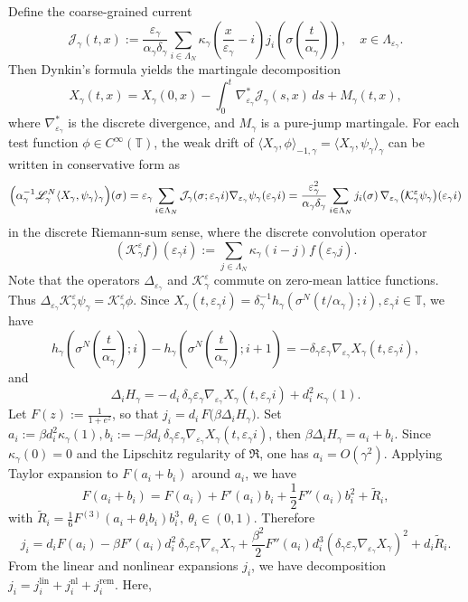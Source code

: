 \documentclass{article}
\begin{document}
Define the coarse-grained current
\[
\mathcal J_\gamma(t,x)
:=
\frac{\varepsilon_\gamma}{\alpha_\gamma\delta_\gamma}
\sum_{i\in\Lambda_N} \kappa_\gamma\!\left(\frac{x}{\varepsilon_\gamma}-i\right)
j_i\!\left(\sigma\!\left(\frac{t}{\alpha_\gamma}\right)\right), \quad x \in \Lambda_{\varepsilon_{\gamma}}.
\]
Then Dynkin's formula yields the martingale decomposition
\[
X_\gamma(t,x) = X_\gamma(0,x) - \int_0^t \nabla^*_{\varepsilon_\gamma} \mathcal J_\gamma(s,x)\,ds + M_\gamma(t,x),
\]
where $\nabla_{\varepsilon_\gamma}^*$ is the discrete divergence, and $M_\gamma$ is a pure-jump martingale.
For each test function $\phi \in C^{\infty}(\mathbb T)$, the weak drift of \(\langle X_\gamma, \phi\rangle_{-1,\gamma}=\langle X_\gamma,\psi_\gamma\rangle_\gamma\) can be written in conservative form as
\[
\Bigl(\alpha_\gamma^{-1}\mathscr L_\gamma^{N}\langle X_\gamma,\psi_\gamma\rangle_\gamma\Bigr)(\sigma) =  \varepsilon_\gamma\sum_{i \in \Lambda_N }\mathcal J_\gamma(\sigma;\varepsilon_{\gamma} i) \nabla_{\varepsilon_\gamma}\psi_\gamma(\varepsilon_{\gamma} i)
=
\frac{\varepsilon_\gamma^2}{\alpha_\gamma\delta_\gamma}
\sum_{i\in\Lambda_N}j_i(\sigma)\,
\nabla_{\varepsilon_\gamma}\bigl(\mathcal K_\gamma^\varepsilon\psi_\gamma\bigr)(\varepsilon_\gamma i) 
\]
in the discrete Riemann-sum sense, where the discrete convolution operator
\[
(\mathcal K_\gamma^\varepsilon f)(\varepsilon_\gamma i):= \sum_{j \in\Lambda_N}\kappa_\gamma(i-j)f(\varepsilon_\gamma j).
\]
Note that the operators \(\Delta_{\varepsilon_\gamma}\) and \(\mathcal K_\gamma^\varepsilon\)  commute on zero-mean lattice functions. Thus
\( \Delta_{\varepsilon_\gamma}\mathcal K_\gamma^\varepsilon\psi_\gamma = \mathcal K_\gamma^\varepsilon\phi\).
Since \( X_\gamma(t,\varepsilon_\gamma i)
=
\delta_\gamma^{-1}
h_\gamma\!\left(\sigma^N(t/\alpha_\gamma);i\right), \varepsilon_\gamma i\in \mathbb T\), we have
\[
h_\gamma\!\left(\sigma^N\left(\frac{t}{\alpha_\gamma}\right);i\right)
-
h_\gamma\!\left(\sigma^N\left(\frac{t}{\alpha_\gamma}\right);i+1\right)
=
-\delta_\gamma\varepsilon_\gamma
\nabla_{\varepsilon_\gamma}X_\gamma(t, \varepsilon_{\gamma} i),
\]
and
\[
\Delta_i H_\gamma = -\,d_i\,\delta_\gamma\varepsilon_\gamma
\nabla_{\varepsilon_\gamma}X_\gamma(t,\varepsilon_{\gamma} i)
+d_i^2\,\kappa_\gamma(1).
\]
Let \(F(z):=\frac{1}{1+e^z}\), so that
\(
j_i=d_i\,F\!\bigl(\beta\Delta_i H_\gamma\bigr).
\)
Set
\(a_i:=\beta d_i^2\kappa_\gamma(1), b_i:=-\beta d_i\,\delta_\gamma\varepsilon_\gamma
\nabla_{\varepsilon_\gamma}X_\gamma(t,\varepsilon_{\gamma} i)\), then
\(
\beta\Delta_i H_\gamma=a_i+b_i.
\)
Since $ \kappa_{\gamma}(0) = 0$ and the Lipschitz regularity of $\mathfrak R$, one has \(a_i=O(\gamma^2)\).
Applying Taylor expansion to \(F(a_i+b_i)\) around \(a_i\), we have
\[
F(a_i+b_i) = F(a_i)+F'(a_i)b_i+\frac12F''(a_i)b_i^2+ \widetilde R_i,
\]
with
\(
\widetilde R_i = \frac16 F^{(3)}(a_i+\theta_i b_i)b_i^3, \ \theta_i\in(0,1).
\)
Therefore
\[
j_i = d_iF(a_i)
-\beta F'(a_i)d_i^2\,\delta_\gamma\varepsilon_\gamma
\nabla_{\varepsilon_\gamma}X_\gamma
+\frac{\beta^2}{2}F''(a_i)d_i^3
(\delta_\gamma\varepsilon_\gamma\nabla_{\varepsilon_\gamma}X_\gamma)^2
+ d_i \widetilde R_i.
\]
From the linear and nonlinear expansions $j_i$, we have decomposition
\(
j_i =j_i^{\mathrm{lin}}+j_i^{\mathrm{nl}}+j_i^{\mathrm{rem}}.
\)
Here,
\end{document}
